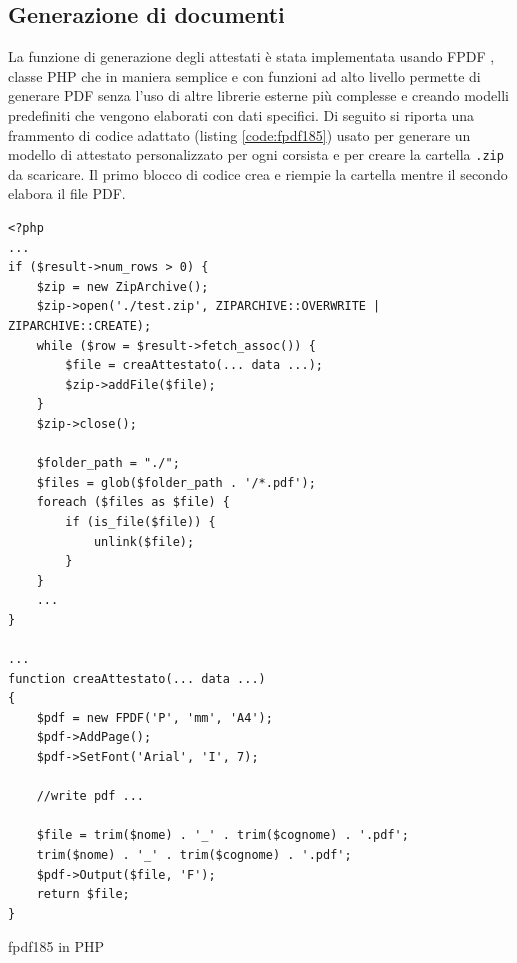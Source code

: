 \subsection{Generazione di documenti}
\label{sec:attestati}
La funzione di generazione degli attestati è stata implementata usando FPDF \cite{fpdf}, classe PHP che in maniera semplice e con funzioni ad alto livello permette di generare PDF senza l'uso di altre librerie esterne più complesse e creando modelli predefiniti che vengono elaborati con dati specifici. Di seguito si riporta una frammento di codice adattato (listing \ref{code:fpdf185}) usato per generare un modello di attestato personalizzato per ogni corsista e per creare la cartella \verb|.zip| da scaricare. Il primo blocco di codice crea e riempie la cartella mentre il secondo elabora il file PDF. 
\begin{listing}[!hbt]
\begin{verbatim}
<?php 
...
if ($result->num_rows > 0) {
    $zip = new ZipArchive();
    $zip->open('./test.zip', ZIPARCHIVE::OVERWRITE | ZIPARCHIVE::CREATE);
    while ($row = $result->fetch_assoc()) {
        $file = creaAttestato(... data ...);
        $zip->addFile($file);
    }
    $zip->close();
    
    $folder_path = "./";
    $files = glob($folder_path . '/*.pdf');
    foreach ($files as $file) {
        if (is_file($file)) {
            unlink($file);
        }
    }
    ...
}

...
function creaAttestato(... data ...)
{
    $pdf = new FPDF('P', 'mm', 'A4');
    $pdf->AddPage();
    $pdf->SetFont('Arial', 'I', 7);

    //write pdf ...
    
    $file = trim($nome) . '_' . trim($cognome) . '.pdf';
    trim($nome) . '_' . trim($cognome) . '.pdf';
    $pdf->Output($file, 'F');
    return $file;
}
\end{verbatim}
\caption{fpdf185 in PHP}
\label{code:fpdf185}
\end{listing}
\noindent
\newline

